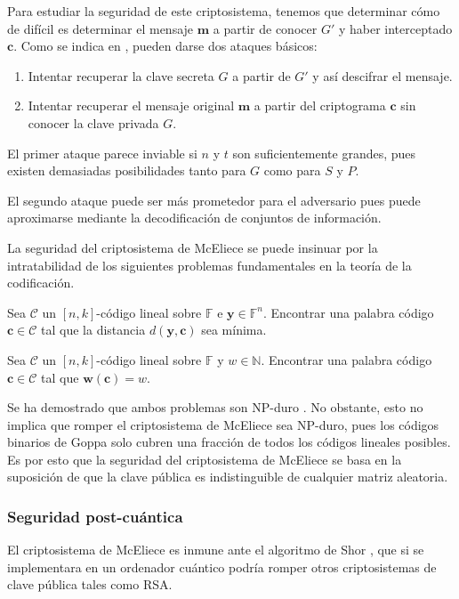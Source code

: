 Para estudiar la seguridad de este criptosistema, tenemos que determinar cómo de difícil es determinar el mensaje $\textbf{m}$ a partir de conocer $G'$ y haber interceptado $\textbf{c}$. Como se indica en \cite{McEliece_1978}, pueden darse dos ataques básicos:

\begin{enumerate}
    \item Intentar recuperar la clave secreta $G$ a partir de $G'$ y así descifrar el mensaje.
    \item Intentar recuperar el mensaje original $\textbf{m}$ a partir del criptograma $\textbf{c}$ sin conocer la clave privada $G$.
\end{enumerate}

El primer ataque parece inviable si $n$ y $t$ son suficientemente grandes, pues existen demasiadas posibilidades tanto para $G$ como para $S$ y $P$.

El segundo ataque puede ser más prometedor para el adversario pues puede aproximarse mediante la decodificación de conjuntos de información.

La seguridad del criptosistema de McEliece se puede insinuar por la intratabilidad de los siguientes problemas fundamentales en la teoría de la codificación.

\begin{problemth}
    Sea $\mathcal{C}$ un $[n, k]$-código lineal sobre $\mathbb{F}$ e $\textbf{y} \in \mathbb{F}^n$. Encontrar una palabra código $\textbf{c} \in \mathcal{C}$ tal que la distancia $d(\textbf{y}, \textbf{c})$ sea mínima.
\end{problemth}

\begin{problemth}
    Sea $\mathcal{C}$ un $[n, k]$-código lineal sobre $\mathbb{F}$ y $w \in \mathbb{N}$. Encontrar una palabra código $\textbf{c} \in \mathcal{C}$ tal que $\textbf{w}(\textbf{c}) = w$.
\end{problemth}

Se ha demostrado que ambos problemas son NP-duro \cite{Intractability_coding_problems}. No obstante, esto no implica que romper el criptosistema de McEliece sea NP-duro, pues los códigos binarios de Goppa solo cubren una fracción de todos los códigos lineales posibles. Es por esto que la seguridad del criptosistema de McEliece se basa en la suposición de que la clave pública es indistinguible de cualquier matriz aleatoria.

\subsubsection{Seguridad post-cuántica}

El criptosistema de McEliece es inmune ante el algoritmo de Shor \cite{Shor_1997}, que si se implementara en un ordenador cuántico podría romper otros criptosistemas de clave pública tales como RSA. 